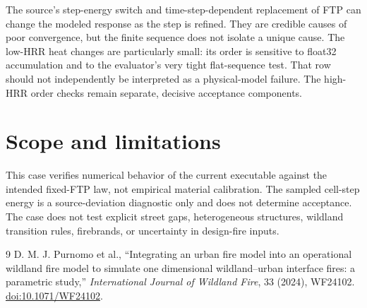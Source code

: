 The source's step-energy switch and time-step-dependent replacement of FTP can
change the modeled response as the step is refined. They are credible causes
of poor convergence, but the finite sequence does not isolate a unique cause.
The low-HRR heat changes are particularly small: its order is sensitive to
float32 accumulation and to the evaluator's very tight flat-sequence test.
That row should not independently be interpreted as a physical-model failure.
The high-HRR order checks remain separate, decisive acceptance components.

\section{Scope and limitations}
This case verifies numerical behavior of the current executable against the
intended fixed-FTP law, not empirical material calibration. The sampled
cell-step energy is a source-deviation diagnostic only and does not determine
acceptance. The case does not test explicit street gaps, heterogeneous
structures, wildland transition rules, firebrands, or uncertainty in
design-fire inputs.

\begin{thebibliography}{9}
 D. M. J. Purnomo et al., ``Integrating an urban fire model into an operational wildland fire model to simulate one dimensional wildland--urban interface fires: a parametric study,'' \emph{International Journal of Wildland Fire}, 33 (2024), WF24102. \href{https://doi.org/10.1071/WF24102}{doi:10.1071/WF24102}.
\end{thebibliography}
